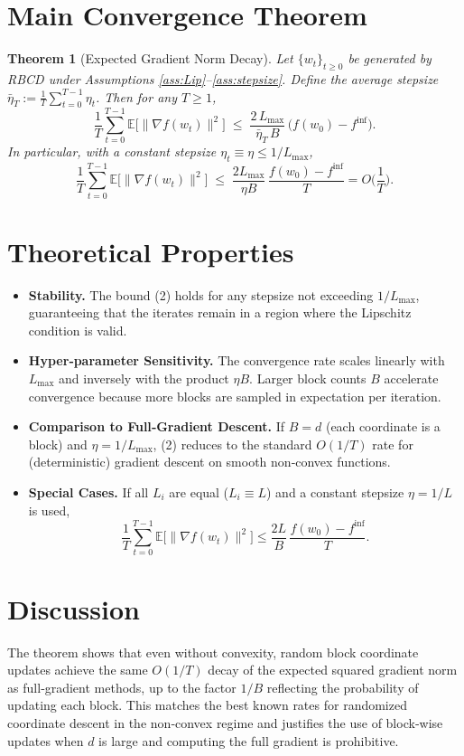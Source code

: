 \documentclass{article}
\newtheorem{theorem}{Theorem}
\begin{document}
\section*{Main Convergence Theorem}
\begin{theorem}[Expected Gradient Norm Decay]\label{thm:main}
Let $\{w_t\}_{t\ge0}$ be generated by RBCD under Assumptions
\ref{ass:Lip}–\ref{ass:stepsize}.  Define the average stepsize
$\bar\eta_T:=\frac{1}{T}\sum_{t=0}^{T-1}\eta_t$.
Then for any $T\ge 1$,
\[
\frac{1}{T}\sum_{t=0}^{T-1}
\mathbb{E}\!\big[\|\nabla f(w_t)\|^{2}\big]
\;\le\;
\frac{2\,L_{\max}}{\bar\eta_T\,B}\,
\big(f(w_0)-f^{\inf}\big).
\tag{2}
\]
In particular, with a constant stepsize $\eta_t\equiv\eta\le 1/L_{\max}$,
\[
\frac{1}{T}\sum_{t=0}^{T-1}
\mathbb{E}\!\big[\|\nabla f(w_t)\|^{2}\big]
\;\le\;
\frac{2L_{\max}}{\eta B}\,
\frac{f(w_0)-f^{\inf}}{T}
= O\!\Big(\frac{1}{T}\Big).
\]
\end{theorem}

\section*{Theoretical Properties}
\begin{itemize}
\item \textbf{Stability.} The bound (2) holds for any stepsize not exceeding
$1/L_{\max}$, guaranteeing that the iterates remain in a region where the
Lipschitz condition is valid.
\item \textbf{Hyper‑parameter Sensitivity.}
The convergence rate scales linearly with $L_{\max}$ and inversely with the
product $\eta B$.  Larger block counts $B$ accelerate convergence because
more blocks are sampled in expectation per iteration.
\item \textbf{Comparison to Full‑Gradient Descent.}
If $B=d$ (each coordinate is a block) and $\eta=1/L_{\max}$, (2) reduces to the
standard $O(1/T)$ rate for (deterministic) gradient descent on smooth
non‑convex functions.
\item \textbf{Special Cases.}
If all $L_i$ are equal ($L_i\equiv L$) and a constant stepsize $\eta=1/L$ is used,
\[
\frac{1}{T}\sum_{t=0}^{T-1}
\mathbb{E}\!\big[\|\nabla f(w_t)\|^{2}\big]
\le \frac{2L}{B}\,\frac{f(w_0)-f^{\inf}}{T}.
\]
\end{itemize}

\section*{Discussion}
The theorem shows that even without convexity, random block coordinate
updates achieve the same $O(1/T)$ decay of the expected squared gradient
norm as full‑gradient methods, up to the factor $1/B$ reflecting the
probability of updating each block.  This matches the best known rates for
randomized coordinate descent in the non‑convex regime and justifies the
use of block‑wise updates when $d$ is large and computing the full gradient
is prohibitive.
\end{document}
